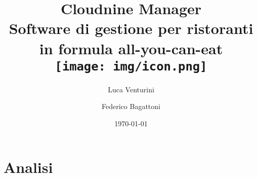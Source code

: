 \documentclass[a4paper,12pt]{report}
\begin{document}
\title{Cloudnine Manager\\
\vspace{1em}
\small Software di gestione per ristoranti in formula all-you-can-eat \\
\vspace{2em}
\texttt{[image: img/icon.png]}
}


\author{Luca Venturini \and Federico Bagattoni}

\date{\today}

\maketitle

\tableofcontents
\chapter{Analisi}
\end{document}
